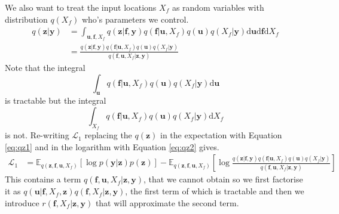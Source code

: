 \documentclass[12pt]{article}
\newcommand{\ub}{\mathbf{u}}
\newcommand{\zb}{\mathbf{z}}
\newcommand{\fb}{\mathbf{f}}
\newcommand{\yb}{\mathbf{y}}
\newcommand{\dd}{\mathrm{d}}
\newcommand{\Lo}{\mathcal{L}_1}
\newcommand{\Ex}{\mathbb{E}}
\begin{document}
We also want to treat the input locations $X_f$ as random variables with distribution $q(X_f)$ who's parameters we control.
%
\begin{align}
q(\zb|\yb) &= \int_{\ub,\fb,X_f} q(\zb|\fb, \yb)q(\fb|\ub,X_f)q(\ub)q(X_f|\yb) \dd\ub \dd\fb \dd X_f \label{eq:qz1} \\
&= \frac{q(\zb |\fb, \yb)q(\fb|\ub,X_f)q(\ub)q(X_f|\yb)}{q(\fb,\ub,X_f|\zb,\yb)} \label{eq:qz2}
\end{align}
%
Note that the integral
%
\begin{equation}
\int_{\ub} q(\fb|\ub,X_f)q(\ub)q(X_f|\yb) \dd\ub
\end{equation}
%
is tractable but the integral
\begin{equation}
\int_{X_f} q(\fb|\ub,X_f)q(\ub)q(X_f|\yb) \dd X_f
\end{equation}
%
is not.
%
Re-writing $\Lo$ replacing the $q(\zb)$ in the expectation with Equation \ref{eq:qz1} and in the logarithm with Equation \ref{eq:qz2} gives.
%
\begin{align}
\Lo &= \Ex_{q(\zb,\fb,\ub,X_f)}[\log p(\yb|\zb)p(\zb)] - \Ex_{q(\zb,\fb,\ub,X_f)}\left[\log\frac{q(\zb |\fb, \yb)q(\fb|\ub,X_f)q(\ub)q(X_f|\yb)}{q(\fb,\ub,X_f|\zb,\yb)}\right]
\end{align}
%
This contains a term $q(\fb,\ub,X_f|\zb,\yb)$, that we cannot obtain so we first factorise it as $q(\ub|\fb, X_f, \zb)q(\fb,X_f | \zb,\yb)$, the first term of which is tractable and then we introduce $r(\fb,X_f|\zb,\yb)$ that will approximate the second term.
%
\end{document}

